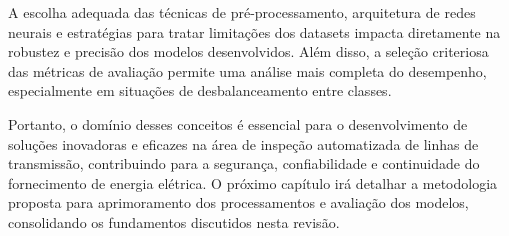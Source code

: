 A escolha adequada das técnicas de pré-processamento, arquitetura de redes neurais e estratégias para tratar limitações dos datasets impacta diretamente na robustez e precisão dos modelos desenvolvidos. Além disso, a seleção criteriosa das métricas de avaliação permite uma análise mais completa do desempenho, especialmente em situações de desbalanceamento entre classes.

Portanto, o domínio desses conceitos é essencial para o desenvolvimento de soluções inovadoras e eficazes na área de inspeção automatizada de linhas de transmissão, contribuindo para a segurança, confiabilidade e continuidade do fornecimento de energia elétrica. O próximo capítulo irá detalhar a metodologia proposta para aprimoramento dos processamentos e avaliação dos modelos, consolidando os fundamentos discutidos nesta revisão.
